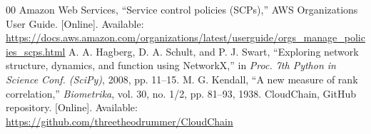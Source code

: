 \documentclass[conference]{IEEEtran}
\begin{document}
\begin{thebibliography}{00}
 Amazon Web Services, ``Service control policies (SCPs),'' AWS Organizations User Guide. [Online]. Available: \url{https://docs.aws.amazon.com/organizations/latest/userguide/orgs_manage_policies_scps.html}
 A. A. Hagberg, D. A. Schult, and P. J. Swart, ``Exploring network structure, dynamics, and function using NetworkX,'' in \textit{Proc. 7th Python in Science Conf. (SciPy)}, 2008, pp. 11--15.
 M. G. Kendall, ``A new measure of rank correlation,'' \textit{Biometrika}, vol. 30, no. 1/2, pp. 81--93, 1938.
 CloudChain, GitHub repository. [Online]. Available: \url{https://github.com/threetheodrummer/CloudChain}
\end{thebibliography}
\end{document}
